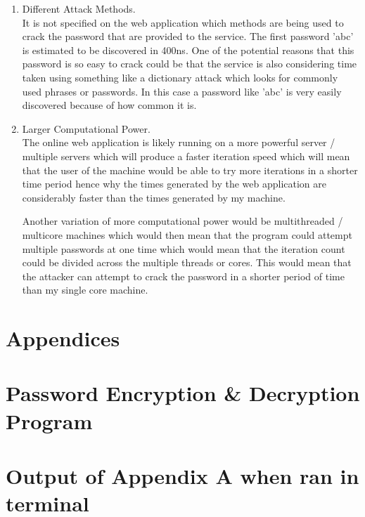 \documentclass[a4paper, twoside, 11pt]{article}
\begin{document}
\begin{enumerate}
	\item Different Attack Methods.\\
	It is not specified on the web application which methods are being used to crack the password that are provided to the service. 
	The first password 'abc' is estimated to be discovered in 400ns. One of the potential reasons that this password is so easy to crack
	 could be that the service is also considering time taken using something like a dictionary attack which looks for commonly used phrases or passwords. 
	 In this case a password like 'abc' is very easily discovered because of how common it is. 

	
	\item Larger Computational Power.\\
	The online web application is likely running on a more powerful server / multiple servers which will produce a faster iteration speed
	 which will mean that the user of the machine would be able to try more iterations in a shorter time period hence why the times generated
	  by the web application are considerably faster than the times generated by my machine.

	Another variation of more computational power would be multithreaded / multicore machines which would then mean that the program
	could attempt multiple passwords at one time which would mean that the iteration count could be divided across the multiple threads or cores.
	 This would mean that the attacker can attempt to crack the password in a shorter period of time than my single core machine.
\end{enumerate}

\newpage
\section*{Appendices}
\appendix
\section{Password Encryption \& Decryption Program}

\newpage
\section{Output of Appendix A when ran in terminal}

\end{document}

